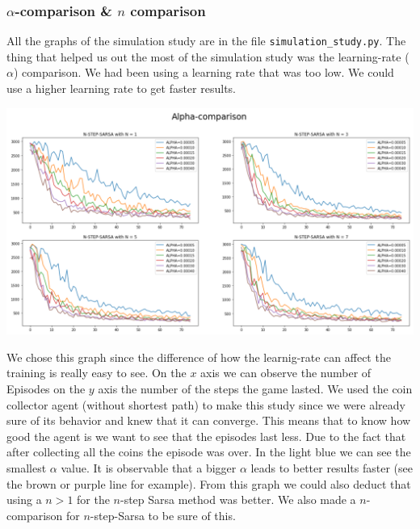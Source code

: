 \subsubsection*{$\alpha$-comparison \& $n$ comparison}
All the graphs of the simulation study are in the file \texttt{simulation\_study.py}. The thing that helped us out the most of the simulation study was the learning-rate ($\alpha$) comparison. We had been using a learning rate that was too low. We could use a higher learning rate to get faster results.
\begin{center}
\includegraphics[scale=0.22]{graphics/plot07.png}
\end{center}
We chose this graph since the difference of how the learnig-rate can affect the training is really easy to see. On the $x$ axis we can observe the number of Episodes on the $y$ axis the number of the steps the game lasted. We used the coin collector agent (without shortest path) to make this study since we were already sure of its behavior and knew that it can converge. This means that to know how good the agent is we want to see that the episodes last less. Due to the fact that after collecting all the coins the episode was over. In the light blue we can see the smallest $\alpha$ value. It is observable that a bigger $\alpha$ leads to better results faster (see the brown or purple line for example). From this graph we could also deduct that using a $n>1$ for the $n$-step Sarsa method was better. We also made a $n$-comparison for $n$-step-Sarsa to be sure of this.
\\

